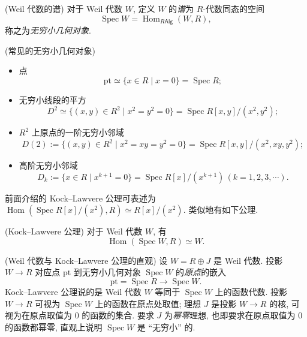
\begin{definition}
	{(Weil 代数的谱)}
	对于 Weil 代数 $W$, 定义 $W$ 的\emph{谱}为 $R$-代数同态的空间
	$$
	\operatorname{Spec}W = \operatorname{Hom}_{R\mathsf {Alg}}(W,R),
	$$
	称之为\emph{无穷小几何对象}.
\end{definition}

\begin{example}
	{(常见的无穷小几何对象)}
	\begin{itemize}
		\item 点 $$\text{pt} \simeq \{x\in R\mid x=0\} = \operatorname{Spec} R;$$
		\item 无穷小线段的平方 $$D^2 \simeq \{(x,y)\in R^2 \mid x^2=y^2=0\} = \operatorname{Spec}R[x,y]/(x^2,y^2);$$
		\item $R^2$ 上原点的一阶无穷小邻域 $$D(2) := \{(x,y)\in R^2\mid x^2=xy=y^2=0\} = \operatorname{Spec}R[x,y]/(x^2,xy,y^2);$$
		\item 高阶无穷小邻域
		$$
		D_k := \{x\in R\mid x^{k+1}=0\} = \operatorname{Spec}R[x]/(x^{k+1})\, (k=1,2,3,\cdots).
		$$
	\end{itemize}
\end{example}

前面介绍的 Kock--Lawvere 公理可表述为 $\operatorname{Hom}(\operatorname{Spec}R[x]/(x^2),R) \simeq R[x]/(x^2)$. 类似地有如下公理.

\begin{axiom}
	{(Kock--Lawvere 公理)}
	对于 Weil 代数 $W$, 有
	$$
	\operatorname{Hom}(\operatorname{Spec}W,R)\simeq W.
	$$
\end{axiom}

\begin{remark}
	{(Weil 代数与 Kock--Lawvere 公理的直观)}
	设 $W=R\oplus J$ 是 Weil 代数. 投影 $W \to R$ 对应点 $\text{pt}$ 到无穷小几何对象 $\operatorname{Spec}W$ 的\emph{原点}的嵌入 $$\text{pt} = \operatorname{Spec} R \to \operatorname{Spec}W.$$
	Kock--Lawvere 公理说的是 Weil 代数 $W$ 等同于 $\operatorname{Spec}W$ 上的函数代数. 投影 $W\to R$ 可视为 $\operatorname{Spec}W$ 上的函数在原点处取值; 理想 $J$ 是投影 $W\to R$ 的核, 可视为在原点取值为 $0$ 的函数的集合.
	要求 $J$ 为\emph{幂零}理想, 也即要求在原点取值为 $0$ 的函数都幂零, 直观上说明 $\operatorname{Spec}W$ 是 ``无穷小'' 的.
\end{remark}

